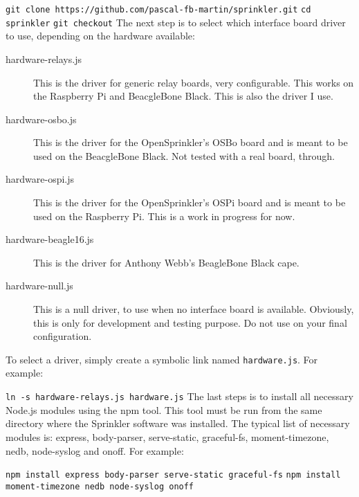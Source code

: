 \documentclass[11pt]{book}
\begin{document}
\indent\texttt{git clone https://github.com/pascal-fb-martin/sprinkler.git}
\linebreak
\indent\texttt{cd sprinkler}
\linebreak
\indent\texttt{git checkout}
\linebreak
The next step is to select which interface board driver to use, depending on the hardware available:
\begin{description}
\item[hardware-relays.js] This is the driver for generic relay boards, very configurable. This works on the Raspberry Pi and BeacgleBone Black. This is also the driver I use.
\item[hardware-osbo.js] This is the driver for the OpenSprinkler's OSBo board and is meant to be used on the BeacgleBone Black. Not tested with a real board, through.
\item[hardware-ospi.js] This is the driver for the OpenSprinkler's OSPi board and is meant to be used on the Raspberry Pi. This is a work in progress for now.
\item[hardware-beagle16.js] This is the driver for Anthony Webb's BeagleBone Black cape.
\item[hardware-null.js] This is a null driver, to use when no interface board is available. Obviously, this is only for development and testing purpose. Do not use on your final configuration.
\end{description}
To select a driver, simply create a symbolic link named \texttt{hardware.js}. For example:

\indent\texttt{ln -s hardware-relays.js hardware.js}
\linebreak
The last steps is to install all necessary Node.js modules using the npm tool. This tool must be run from the same directory where the Sprinkler software was installed. The typical list of necessary modules is: express, body-parser, serve-static, graceful-fs,  moment-timezone,  nedb,  node-syslog and onoff. For example:

\indent\texttt{npm install express body-parser serve-static graceful-fs}
\linebreak
\indent\texttt{npm install moment-timezone nedb node-syslog onoff}
\linebreak
\end{document}
